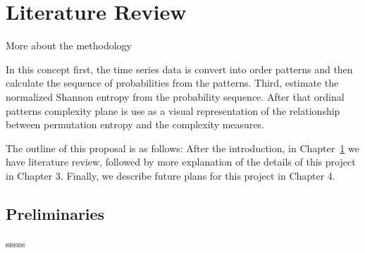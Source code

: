 \chapter{Literature Review}\label{C:lit}

More about the methodology 

In this concept first, the time series data is convert into order patterns and then calculate the sequence of probabilities from the patterns. Third, estimate the normalized Shannon entropy from the probability sequence.  After that ordinal patterns complexity plane is use as a visual representation of the relationship between permutation entropy and the complexity measures. 



The outline of this proposal is as follows: After the introduction, in 
Chapter~\ref{C:lit} 
we have literature review, followed by more explanation of the details of this project in Chapter 3. Finally, we describe future plans for this project in Chapter 4.

\section{Preliminaries}
sssss

